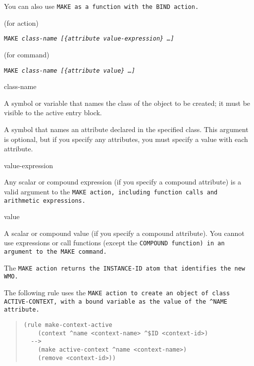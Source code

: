 You can also use \tt{MAKE} as a function with the \tt{BIND} action.

\Format (for action)

\tt{MAKE} \it{class-name} [\{\ct\it{attribute} \it{value-expression}\} \ldots]

\Format (for command)

\tt{MAKE} \it{class-name} [\{\ct\it{attribute} \it{value}\} \ldots]

\begin{arguments}
\item[class-name]

  A symbol or variable that names the class of the object to be
  created; it must be visible to the active entry block.

\item[\ct{attribute}]

  A symbol that names an attribute declared in the specified
  class. This argument is optional, but if you specify any attributes,
  you must specify a value with each attribute.

\item[value-expression]

  Any scalar or compound expression (if you specify a compound
  attribute) is a valid argument to the \tt{MAKE} action, including
  function calls and arithmetic expressions.

\item[value]

  A scalar or compound value (if you specify a compound
  attribute). You cannot use expressions or call functions (except the
  \tt{COMPOUND} function) in an argument to the \tt{MAKE} command.
\end{arguments}

\ReturnValue

The \tt{MAKE} action returns the \tt{INSTANCE-ID} atom that identifies
the new WMO.

\Example

The following rule uses the \tt{MAKE} action to create an object of
class \tt{ACTIVE-CONTEXT}, with a bound variable as the value of the
\verb|^NAME| attribute.

\begin{quote}
\begin{verbatim}
(rule make-context-active
    (context ^name <context-name> ^$ID <context-id>)
  -->
    (make active-context ^name <context-name>)
    (remove <context-id>))
\end{verbatim}
\end{quote}

